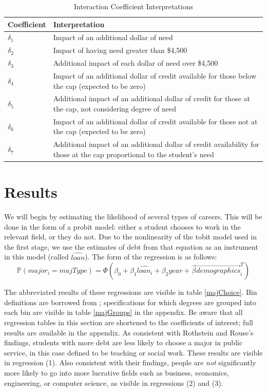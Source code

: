 \documentclass[12pt]{article}
\begin{document}
	\begin{table}
		\centering
		\caption{Interaction Coefficient Interpretations}		
		\begin{tabular}{lp{8cm}}
			\toprule
			Coefficient & Interpretation\\
			\midrule
			$\delta_1$ & Impact of an additional dollar of need\\
			$\delta_2$ & Impact of having need greater than \$4,500 \\
			$\delta_3$ & Additional impact of each dollar of need over \$4,500 \\
			$\delta_4$ & Impact of an additional dollar of credit available for those below the cap (expected to be zero)\\
			$\delta_5$ & Additional impact of an additional dollar of credit for those at the cap, not considering degree of need\\
			$\delta_6$ & Impact of an additional dollar of credit available for those not at the cap (expected to be zero)\\
			$\delta_7$ & Additional impact of an additional dollar of credit availability for those at the cap proportional to the student's need \\
			\bottomrule
		\end{tabular}
	
		\label{coefInterp}
	\end{table}
	
	
	\section{Results}
	
	We will begin by estimating the likelihood of several types of careers. This will be done in the form of a probit model: either a student chooses to work in the relevant field, or they do not. Due to the nonlinearity of the tobit model used in the first stage, we use the estimates of debt from that equation as an instrument in this model (called $\hat{loan}$). The form of the regression is as follows: $$\mathbb{P}\left(major_i = majType\right) = \Phi\left(\beta_0 + \beta_1 \hat{loan_i} + \beta_2 year + \vec{\beta}\vec{demographics}^T_i\right)$$
	
	The abbreviated results of these regressions are visible in table \ref{majChoice}. Bin definitions are borrowed from \textcite{rothstein2011}; specifications for which degrees are grouped into each bin are visible in table \ref{majGroups} in the appendix. Be aware that all regression tables in this section are shortened to the coefficients of interest; full results are available in the appendix. As consistent with Rothstein and Rouse's findings, students with more debt are less likely to choose a major in public service, in this case defined to be teaching or social work. These results are visible in regression (1). Also consistent with their findings, people are \emph{not} significantly more likely to go into more lucrative fields such as business, economics, engineering, or computer science, as visible in regressions (2) and (3). 
\end{document}
